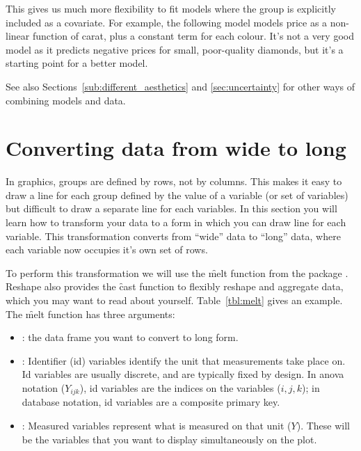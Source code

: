 This gives us much more flexibility to fit models where the group is explicitly included as a covariate.  For example, the following model models price as a non-linear function of carat, plus a constant term for each colour.  It's not a very good model as it predicts negative prices for small, poor-quality diamonds, but it's a starting point for a better model.

% 


See also Sections~\ref{sub:different_aesthetics} and \ref{sec:uncertainty} for other ways of combining models and data.

\section{Converting data from wide to long}
\label{sec:melting}

In \ggplot graphics, groups are defined by rows, not by columns.  This makes it easy to draw a line for each group defined by the value of a variable (or set of variables) but difficult to draw a separate line for each variables.  In this section you will learn how to transform your data to a form in which you can draw line for each variable.  This transformation converts from ``wide'' data to ``long'' data, where each variable now occupies it's own set of rows.

To perform this transformation we will use the \f{melt} function from the  package \citep{wickham:2007b}.  Reshape also provides the \f{cast} function to flexibly reshape and aggregate data, which you may want to read about yourself.   Table~\ref{tbl:melt} gives an example.  The \f{melt} function has three arguments:

\begin{itemize}
  \item {}: the data frame you want to convert to long form.

  \item {}: Identifier (id) variables identify the unit that measurements take place on.  Id variables are usually discrete, and are typically fixed by design.  In {\sc anova} notation ($Y_{ijk}$), id variables are the indices on the variables ($i, j, k$); in database notation, id variables are a composite primary key.

  \item {}: Measured variables represent what is measured on that unit ($Y$).  These will be the variables that you want to display simultaneously on the plot.
\end{itemize}

